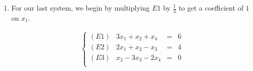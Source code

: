 \documentclass{ximera}
\begin{document}
\begin{example}
\begin{enumerate}
\[\begin{array}{ccc}
\begin{array}{lrcr}
\end{array} 

\right.

\end{array}\]


Finally, we rid $E3$ of $y$.

\[\begin{array}{ccc}

\left\{ 

\begin{array}{lrcr}

(E1) & x+\frac{3}{2}y-\frac{1}{2}z & = & \frac{1}{2} \\  
(E2) & y - \frac{4}{15}z & = & \frac{1}{5} \\  
(E3) & -15y+4z & = & 3 \\

\end{array} 

\right.
&
\xrightarrow{\text{Replace $E3$ with $15E2 + E3$}}

&

\left\{ 

\begin{array}{lrcr}

(E1) & x-y+z & = & 5 \\  
(E2) & y - \frac{1}{2}z & = & -3\\  
(E3) & 0 & = & 6 \\

\end{array} 

\right.
\end{array}\]

The last equation, $0=6$, is a contradiction so the system has no solution.  According to Theorem \ref{equationmoves}, since this system has no solutions, neither does the original, thus we have an inconsistent system.

\item  For our last system, we begin by multiplying $E1$ by $\frac{1}{3}$ to get a coefficient of $1$ on  $x_1$.

\[\begin{array}{ccc}

\left\{ 

\begin{array}{lrcr}

(E1) & 3x_1 +x_2 + x_4 & = & 6 \\   
(E2) & 2x_1 + x_2 -x_3  & = & 4  \\
(E3) &  x_2 -3x_3 -2x_4 & = & 0 \\


\end{array}
\end{array}\]
\end{enumerate}
\end{example}
\end{document}
